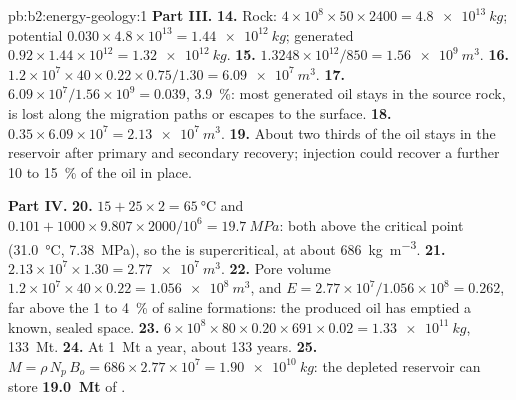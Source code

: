 \begin{solution}{pb:b2:energy-geology:1}
\noindent\textbf{Part III.}
\textbf{14.} Rock: $4 \times 10^8 \times 50 \times 2400 = \qty{4.8e13}{kg}$; potential $0.030
\times 4.8 \times 10^{13} = \qty{1.44e12}{kg}$; generated $0.92 \times 1.44 \times 10^{12} =
\qty{1.32e12}{kg}$.
\textbf{15.} $1.3248 \times 10^{12}/850 = \qty{1.56e9}{m^3}$.
\textbf{16.} $1.2 \times 10^7 \times 40 \times 0.22 \times 0.75/1.30 = \qty{6.09e7}{m^3}$.
\textbf{17.} $6.09 \times 10^7/1.56 \times 10^9 = 0.039$, \qty{3.9}{\percent}: most generated oil
stays in the source rock, is lost along the migration paths or escapes to the surface.
\textbf{18.} $0.35 \times 6.09 \times 10^7 = \qty{2.13e7}{m^3}$.
\textbf{19.} About two thirds of the oil stays in the reservoir after primary and secondary
recovery;  injection could recover a further 10 to \qty{15}{\percent} of the oil in place.

\noindent\textbf{Part IV.}
\textbf{20.} $15 + 25 \times 2 = \qty{65}{\celsius}$ and $0.101 + 1000 \times 9.807 \times 2000/10^6
= \qty{19.7}{MPa}$: both above the critical point (\qty{31.0}{\celsius}, \qty{7.38}{MPa}), so the
 is supercritical, at about \qty{686}{kg.m^{-3}}.
\textbf{21.} $2.13 \times 10^7 \times 1.30 = \qty{2.77e7}{m^3}$.
\textbf{22.} Pore volume $1.2 \times 10^7 \times 40 \times 0.22 = \qty{1.056e8}{m^3}$, and $E =
2.77 \times 10^7/1.056 \times 10^8 = 0.262$, far above the 1 to \qty{4}{\percent} of saline
formations: the produced oil has emptied a known, sealed space.
\textbf{23.} $6 \times 10^8 \times 80 \times 0.20 \times 691 \times 0.02 = \qty{1.33e11}{kg}$,
\qty{133}{Mt}.
\textbf{24.} At \qty{1}{Mt} a year, about 133 years.
\textbf{25.} $M = \rho\,N_p\,B_o = 686 \times 2.77 \times 10^7 = \qty{1.90e10}{kg}$: the depleted
reservoir can store \textbf{\qty[text-series-to-math=true]{19.0}{Mt}} of .
\end{solution}
